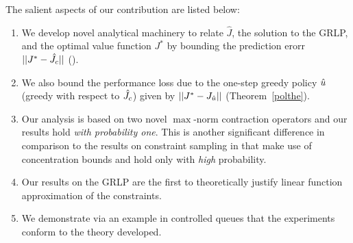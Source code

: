 The salient aspects of our contribution are listed below:
\begin{enumerate}
		\item We develop novel analytical machinery to relate $\hat{J}$, the solution to the GRLP, and the optimal value function $J^*$ by bounding the prediction erorr $||J^*-\hat{J}_c||$ (). 
		\item We also bound the performance loss due to the one-step greedy policy $\hat{u}$ (greedy with respect to $\hat{J}_c$) given by $||J^*-J_{\hat{u}}||$ (Theorem~\ref{polthe}).
		\item Our analysis is based on two novel $\max$-norm contraction operators and our results hold \emph{with probability one}. This is another significant difference in comparison to the results on constraint sampling in \cite{SALP,CS} that make use of concentration bounds and hold only with \emph{high} probability.
		\item Our results on the GRLP are the first to theoretically justify linear function approximation of the constraints.
		\item We demonstrate via an example in controlled queues that the experiments conform to the theory developed.
\end{enumerate}

